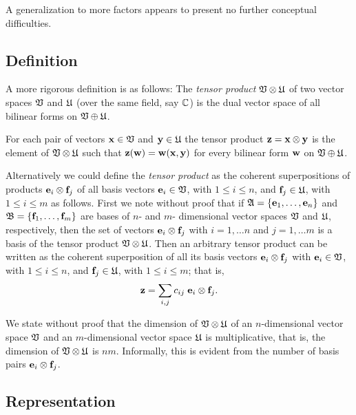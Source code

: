 A generalization to more factors appears to present no further conceptual difficulties.

\subsection{Definition}
A more rigorous definition is as follows:
The {\em tensor product} ${\frak V} \otimes {\frak U}$ of two vector spaces ${\frak V}$
and
${\frak U}$ (over the same field, say ${\Bbb C}$)
is the dual vector space of all bilinear forms on ${\frak V} \oplus {\frak U}$.

For each pair of vectors ${\bf x} \in  {\frak V}$
and
${\bf y} \in  {\frak U}$   the tensor product ${\bf z} = {\bf x} \otimes {\bf y}$
is the element of ${\frak V} \otimes {\frak U}$
such that ${\bf z}({\bf w})={\bf w}({\bf x},{\bf y})$ for every bilinear form
${\bf w}$ on ${\frak V} \oplus {\frak U}$.

Alternatively we could define the {\em tensor product}  as the coherent superpositions of products ${\bf e}_i \otimes {\bf f}_j$
of all basis vectors
${\bf e}_i \in  {\frak V}$, with $1\le i \le n$,
and
${\bf f}_j \in  {\frak U}$, with $1\le i \le m$ as follows.
First we note without proof that if ${\frak A} =\{{\bf e}_1,\ldots , {\bf e}_n\}$ and
${\frak B} =\{{\bf f}_1,\ldots , {\bf f}_m\}$
are bases of  $n$- and $m$-
dimensional vector spaces ${\frak V}$ and  ${\frak U}$, respectively,
then the set
of vectors ${\bf e}_i \otimes {\bf f}_j$
with $i=1,\ldots n$ and $j=1,\ldots m$
 is a basis of the { tensor product}
 ${\frak V} \otimes {\frak U}$.
Then an arbitrary tensor product can be written as the coherent superposition of all
its basis vectors ${\bf e}_i \otimes {\bf f}_j$
with
${\bf e}_i \in  {\frak V}$, with $1\le i \le n$,
and
${\bf f}_j \in  {\frak U}$, with $1\le i \le m$; that is,
\begin{equation}
{\bf z}=\sum_{i,j} c_{ij} \; {\bf e}_i \otimes {\bf f}_j.
\label{2014-m-ch-fdvs-lsqv}
\end{equation}

We state without proof that the dimension
of ${\frak V} \otimes {\frak U}$ of an $n$-dimensional vector space ${\frak V}$
and an $m$-dimensional vector space
${\frak U}$
is multiplicative,
that is, the dimension of  ${\frak V} \otimes {\frak U}$ is $nm$.
Informally, this is evident from the number of basis pairs ${\bf e}_i \otimes {\bf f}_j$.

\subsection{Representation}


